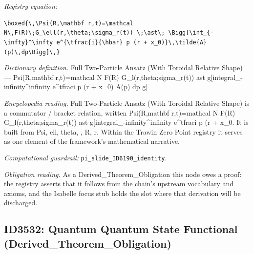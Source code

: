 \documentclass[11pt]{article}
\theoremstyle{remark}
\begin{document}
\noindent\textit{Registry equation:}\par
{\small\texttt{\textbackslash{}boxed\{\textbackslash{},\textbackslash{}Psi(R,\textbackslash{}mathbf r,t)=\textbackslash{}mathcal N\textbackslash{},F(R)\textbackslash{};G\_\textbackslash{}ell(r,\textbackslash{}theta;\textbackslash{}sigma\_r(t)) \textbackslash{};\textbackslash{}ast\textbackslash{}; \textbackslash{}Bigg[\textbackslash{}int\_\{-\textbackslash{}infty\}\textasciicircum{}\textbackslash{}infty e\textasciicircum{}\{\textbackslash{}tfrac\{i\}\{\textbackslash{}hbar\} p (r + x\_0)\}\textbackslash{},\textbackslash{}tilde\{A\}(p)\textbackslash{},dp\textbackslash{}Bigg]\textbackslash{},\}}}\par\medskip
\noindent\textit{Dictionary definition.} Full Two-Particle Ansatz (With Toroidal Relative Shape) --- Psi(R,mathbf r,t)=mathcal N F(R) G\_l(r,theta;sigma\_r(t)) ast g[integral\_-infinity\textasciicircum{}infinity e\textasciicircum{}tfraci p (r + x\_0) A(p) dp g]\par\medskip
\noindent\textit{Encyclopedia reading.} Full Two-Particle Ansatz (With Toroidal Relative Shape) is a commutator / bracket relation, written Psi(R,mathbf r,t)=mathcal N F(R) G\_l(r,theta;sigma\_r(t)) ast g[integral\_-infinity\textasciicircum{}infinity e\textasciicircum{}tfraci p (r + x\_0. It is built from Psi, ell, theta, , R, r. Within the Trawin Zero Point registry it serves as one element of the framework's mathematical narrative.
\par\medskip\noindent\textit{Computational guardrail:} \texttt{pi\_slide\_ID6190\_identity}.
\par\medskip\noindent\textit{Obligation reading.} As a Derived\_Theorem\_Obligation this node owes a proof: the registry asserts that it follows from the chain's upstream vocabulary and axioms, and the Isabelle focus stub holds the slot where that derivation will be discharged.

\subsection{ID3532: Quantum Quantum State Functional (Derived\_Theorem\_Obligation)}
\end{document}
